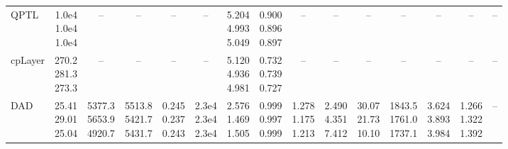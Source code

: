 \begin{landscape}
\begin{table}[t]
{\begin{tabular}{@{}lrrrrrrrrrrrrrr@{}}
QPTL & \makecell[r]{1.0e4\\1.0e4\\1.0e4} & \multicolumn{1}{c}{--} & \multicolumn{1}{c}{--} & \multicolumn{1}{c}{--} & \multicolumn{1}{c}{--} & \makecell[r]{5.204\\4.993\\5.049} & \makecell[r]{0.900\\0.896\\0.897} & \multicolumn{1}{c}{--} & \multicolumn{1}{c}{--} & \multicolumn{1}{c}{--} & \multicolumn{1}{c}{--} & \multicolumn{1}{c}{--} & \multicolumn{1}{c}{--} & \multicolumn{1}{c}{--} \\
cpLayer & \makecell[r]{270.2\\281.3\\273.3} & \multicolumn{1}{c}{--} & \multicolumn{1}{c}{--} & \multicolumn{1}{c}{--} & \multicolumn{1}{c}{--} & \makecell[r]{5.120\\4.936\\4.981} & \makecell[r]{0.732\\0.739\\0.727} & \multicolumn{1}{c}{--} & \multicolumn{1}{c}{--} & \multicolumn{1}{c}{--} & \multicolumn{1}{c}{--} & \multicolumn{1}{c}{--} & \multicolumn{1}{c}{--} & \multicolumn{1}{c}{--} \\
DAD & \makecell[r]{25.41\\29.01\\25.04} & \makecell[r]{5377.3\\5653.9\\4920.7} & \makecell[r]{5513.8\\5421.7\\5431.7} & \makecell[r]{0.245\\0.237\\0.243} & \makecell[r]{2.3e4\\2.3e4\\2.3e4} & \makecell[r]{2.576\\1.469\\1.505} & \makecell[r]{0.999\\0.997\\0.999} & \makecell[r]{1.278\\1.175\\1.213} & \makecell[r]{2.490\\4.351\\7.412} & \makecell[r]{30.07\\21.73\\10.10} & \makecell[r]{1843.5\\1761.0\\1737.1} & \makecell[r]{3.624\\3.893\\3.984} & \makecell[r]{1.266\\1.322\\1.392} & \multicolumn{1}{c}{--} \\
\bottomrule
\end{tabular}%
}
\end{table}
\end{landscape}
